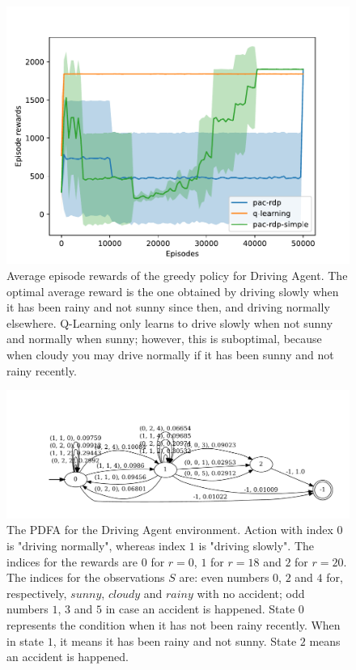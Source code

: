 \documentclass{article}
\begin{document}
\begin{figure}[!h]
 \centering
 \includegraphics[width=\linewidth]{plot-drivingagent.pdf}
 \caption{Average episode rewards of the greedy policy for Driving Agent.
 The optimal average reward is the one obtained by
 driving slowly when it has been rainy and not sunny since then,
 and driving normally elsewhere. Q-Learning only learns to drive
 slowly when not sunny and normally when sunny; however, this is suboptimal,
 because when cloudy you may drive normally if it has been sunny and not rainy recently.}
 \label{fig:drivingagent-experiment}
\end{figure}%
\begin{figure}[!h]
 \includegraphics[width=\linewidth]{pdfa-driving_agent.pdf}
 \caption{The PDFA for the Driving Agent environment.
 Action with index $0$ is "driving normally", whereas index $1$ is "driving slowly".
 The indices for the rewards are $0$ for $r=0$, $1$ for $r=18$ and $2$ for $r=20$.
 The indices for the observations $S$ are: even numbers $0$, $2$ and $4$ for, respectively,
 $sunny$, $cloudy$ and $rainy$ with no accident; odd numbers $1$, $3$ and $5$
 in case an accident is happened.
 State $0$ represents the condition when it has not been rainy recently.
 When in state $1$, it means it has been rainy and not sunny.
 State $2$ means an accident is happened.}
 \label{fig:drivingagent-pdfa}
\end{figure}
\end{document}
